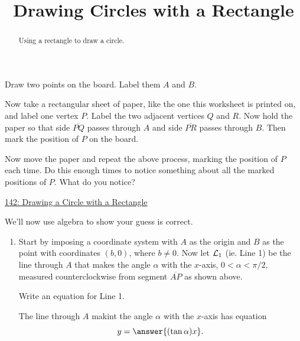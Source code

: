 \documentclass{ximera}
\title{Drawing Circles with a Rectangle}
\begin{document}
\begin{abstract}
Using  a rectangle to draw a circle.
\end{abstract}
\maketitle


\begin{question}  \label{Qpf3f3mbmZ}

Draw two points on the board. Label them $A$ and $B$.

Now take a rectangular sheet of paper, like the one this worksheet is printed on, and label one vertex $P$. Label the two adjacent vertices $Q$ and $R$. Now hold the paper so that side $\overline{PQ}$ passes through $A$ and side $\overline{PR}$ passes through $B$. Then mark the position of $P$ on the board.

Now move the paper and repeat the above process, marking the position of $P$ each time. Do this enough times to notice something about all the marked positions of $P$. What do you notice?
\begin{freeResponse}
\end{freeResponse}


\begin{onlineOnly}
    \begin{center}
\end{center}
\end{onlineOnly}

\href{https://www.desmos.com/calculator/ege2z0djr4}{142: Drawing a Circle with a Rectangle}



We'll now use algebra to show your guess is correct.

\begin{enumerate}
\item Start by imposing a coordinate system with $A$ as the origin and $B$ as the point with coordinates $(b,0)$, where $b\neq 0$. Now let ${\cal L}_1$ (ie. Line 1) be the line through $A$ that makes the angle $\alpha$ with the $x$-axis, $0 < \alpha < \pi/2$, measured counterclockwise from segment $\overline{AP}$ as shown above. 

Write an equation for Line 1.

The line through $A$  makint the angle $\alpha$ with the $x$-axis has equation
\[
    y = \answer{(\tan \alpha)x}.
\]


\end{enumerate}
\end{question}
\end{document}
